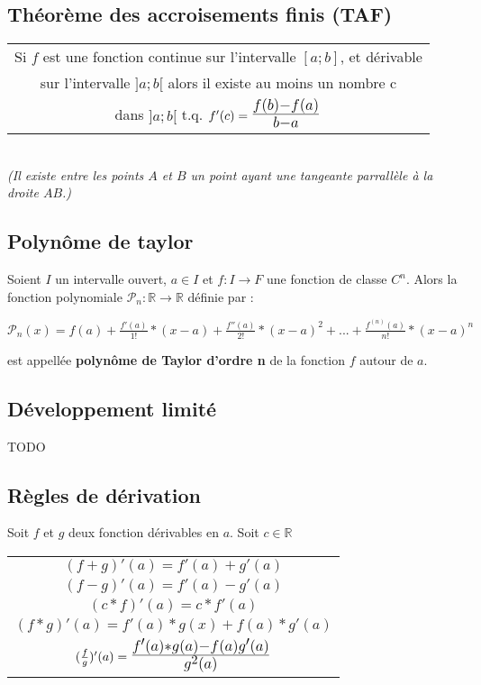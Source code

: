 \documentclass[12pt, a4paper]{book}
\def\mathLarge#1{\mbox{\LARGE $#1$}}
\begin{document}
\subsection{Théorème des accroisements finis (TAF)}
\begin{tabular}{ |c|}
    \hline
    Si $f$ est une fonction continue sur l'intervalle $[a;b]$, et dérivable \\
    sur l'intervalle $]a;b[$ alors il existe au moins un nombre c \\
    dans $]a;b[$ t.q. $f'(c)= \mathLarge{\frac{f(b)-f(a)}{b-a}}$\\
    \hline
\end{tabular}
\newline \\
\textit{(Il existe entre les points $A$ et $B$ un point ayant une tangeante parrallèle à la droite $AB$.)}
\subsection{Polynôme de taylor}
Soient $I$ un intervalle ouvert, $a \in I$ et $f: I \rightarrow F$ une fonction de classe $C^n$. Alors la fonction polynomiale $\mathcal{P}_n : \mathbb{R} \rightarrow \mathbb{R}$
définie par :
\begin{center}
    $\mathcal{P}_n(x) = f(a)+\frac{f'(a)}{1!}*(x-a)+\frac{f''(a)}{2!}*(x-a)^2+...+\frac{f^{(n)}(a)}{n!}*(x-a)^n$
\end{center}
est appellée \textbf{polynôme de Taylor d'ordre n} de la fonction $f$ autour de $a$.
\subsection{Développement limité}
TODO
\newpage
\subsection{Règles de dérivation}
Soit $f$ et $g$ deux fonction dérivables en $a$. Soit $c \in \mathbb{R}$\\
\begin{center}
\begin{tabular}{ |c|}
    \hline
    $(f+g)'(a) = f'(a) + g'(a)$\\
    $(f-g)'(a) = f'(a) - g'(a)$\\
    $(c*f)'(a) = c*f'(a)$\\
    $(f*g)'(a) = f'(a)*g(x) + f(a)*g'(a)$\\
    $(\frac{f}{g})'(a) = \mathLarge{\frac{f'(a)*g(a) - f(a)g'(a)}{g^2(a)}}$\\
    \hline
\end{tabular}
\end{center}
\end{document}
